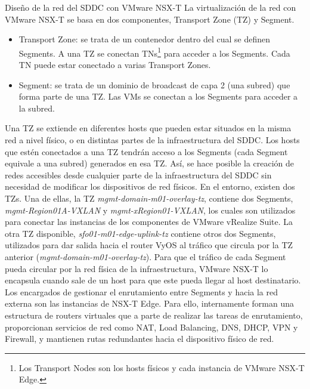 \begin{subsubsection}{Diseño de la red del SDDC con VMware NSX-T}
    La virtualización de la red con VMware NSX-T se basa en dos componentes, Transport Zone (TZ) y Segment.
    \begin{itemize}
        \item Transport Zone: se trata de un contenedor dentro del cual se definen Segments. A una TZ se conectan TNs\footnote{Los Transport Nodes son los hosts físicos y cada instancia de VMware NSX-T Edge.} para acceder a los Segments. Cada TN puede estar conectado a varias Transport Zones.
        \item Segment: se trata de un dominio de broadcast de capa 2 (una subred) que forma parte de una TZ. Las VMs se conectan a los Segments para acceder a la subred.
    \end{itemize}
    Una TZ se extiende en diferentes hosts que pueden estar situados en la misma red a nivel físico, o en distintas partes de la infraestructura del SDDC. Los hosts que estén conectados a una TZ tendrán acceso a los Segments (cada Segment equivale a una subred) generados en esa TZ. Así, se hace posible la creación de redes accesibles desde cualquier parte de la infraestructura del SDDC sin necesidad de modificar los dispositivos de red físicos.
    En el entorno, existen dos TZs. Una de ellas, la TZ \textit{mgmt-domain-m01-overlay-tz}, contiene dos Segments, \textit{mgmt-Region01A-VXLAN} y \textit{mgmt-xRegion01-VXLAN}, los cuales son utilizados para conectar las instancias de los componentes de VMware vRealize Suite. La otra TZ disponible, \textit{sfo01-m01-edge-uplink-tz} contiene otros dos Segments, utilizados para dar salida hacia el router VyOS al tráfico que circula por la TZ anterior (\textit{mgmt-domain-m01-overlay-tz}). Para que el tráfico de cada Segment pueda circular por la red física de la infraestructura, VMware NSX-T lo encapsula cuando sale de un host para que este pueda llegar al host destinatario.
    Los encargados de gestionar el enrutamiento entre Segments y hacia la red externa son las instancias de NSX-T Edge. Para ello, internamente forman una estructura de routers virtuales que a parte de realizar las tareas de enrutamiento, proporcionan servicios de red como NAT, Load Balancing, DNS, DHCP, VPN y Firewall, y mantienen rutas redundantes hacia el dispositivo físico de red.
    \begin{figure}[h]
        \centering

\end{figure}
\end{subsubsection}
